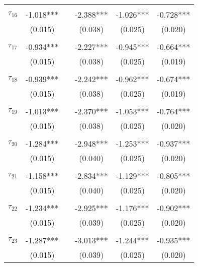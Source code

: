 \begin{tabular}{@{\extracolsep{-5pt}}lccccc}
                &           &&           &           &           \\[-2.1ex]
$\tau_{16}$     & -1.018*** && -2.388*** & -1.026*** & -0.728*** \\
                &  (0.015)  &&  (0.038)  &  (0.025)  &  (0.020)  \\
                &           &&           &           &           \\[-2.1ex]
$\tau_{17}$     & -0.934*** && -2.227*** & -0.945*** & -0.664*** \\
                &  (0.015)  &&  (0.038)  &  (0.025)  &  (0.019)  \\
                &           &&           &           &           \\[-2.1ex]
$\tau_{18}$     & -0.939*** && -2.242*** & -0.962*** & -0.674*** \\
                &  (0.015)  &&  (0.038)  &  (0.025)  &  (0.019)  \\
                &           &&           &           &           \\[-2.1ex]
$\tau_{19}$     & -1.013*** && -2.370*** & -1.053*** & -0.764*** \\
                &  (0.015)  &&  (0.038)  &  (0.025)  &  (0.020)  \\
                &           &&           &           &           \\[-2.1ex]
$\tau_{20}$     & -1.284*** && -2.948*** & -1.253*** & -0.937*** \\
                &  (0.015)  &&  (0.040)  &  (0.025)  &  (0.020)  \\
                &           &&           &           &           \\[-2.1ex]
$\tau_{21}$     & -1.158*** && -2.834*** & -1.129*** & -0.805*** \\
                &  (0.015)  &&  (0.040)  &  (0.025)  &  (0.020)  \\
                &           &&           &           &           \\[-2.1ex]
$\tau_{22}$     & -1.234*** && -2.925*** & -1.176*** & -0.902*** \\
                &  (0.015)  &&  (0.039)  &  (0.025)  &  (0.020)  \\
                &           &&           &           &           \\[-2.1ex]
$\tau_{23}$     & -1.287*** && -3.013*** & -1.244*** & -0.935*** \\
                &  (0.015)  &&  (0.039)  &  (0.025)  &  (0.020)  \\

\end{tabular}

